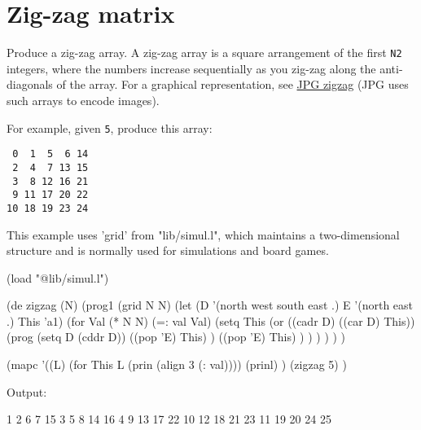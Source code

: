 \pagebreak{}
\section*{Zig-zag matrix}


Produce a zig-zag array. A zig-zag array is a square arrangement of the
first \texttt{N2} integers, where the numbers increase sequentially as
you zig-zag along the anti-diagonals of the array. For a graphical
representation, see
\href{http://en.wikipedia.org/wiki/Image:JPEG\_ZigZag.svg}{JPG zigzag}
(JPG uses such arrays to encode images).

For example, given \texttt{5}, produce this array:

\begin{verbatim}
 0  1  5  6 14
 2  4  7 13 15
 3  8 12 16 21
 9 11 17 20 22
10 18 19 23 24
\end{verbatim}


\begin{wideverbatim}

This example uses 'grid' from "lib/simul.l", which maintains a two-dimensional
structure and is normally used for simulations and board games.

(load "@lib/simul.l")

(de zigzag (N)
   (prog1 (grid N N)
      (let (D '(north west  south east  .)  E '(north east .)  This 'a1)
         (for Val (* N N)
            (=: val Val)
            (setq This
               (or
                  ((cadr D) ((car D) This))
                  (prog
                     (setq D (cddr D))
                     ((pop 'E) This) )
                  ((pop 'E) This) ) ) ) ) ) )

(mapc
   '((L)
      (for This L (prin (align 3 (: val))))
      (prinl) )
   (zigzag 5) )

Output:

  1  2  6  7 15
  3  5  8 14 16
  4  9 13 17 22
 10 12 18 21 23
 11 19 20 24 25


\end{wideverbatim}                 


% 

